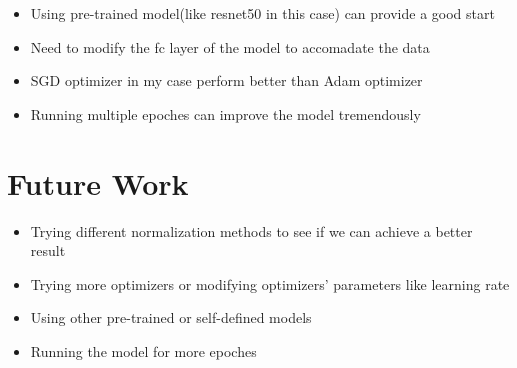 \documentclass[11pt]{article}
\providecommand{\tightlist}{%
      \setlength{\itemsep}{0pt}\setlength{\parskip}{0pt}}
\begin{document}
    \begin{itemize}
\tightlist
\item
  Using pre-trained model(like resnet50 in this case) can provide a good
  start
\item
  Need to modify the fc layer of the model to accomadate the data
\item
  SGD optimizer in my case perform better than Adam optimizer
\item
  Running multiple epoches can improve the model tremendously
\end{itemize}

    \hypertarget{future-work}{%
\section{Future Work}\label{future-work}}

    \begin{itemize}
\tightlist
\item
  Trying different normalization methods to see if we can achieve a
  better result
\item
  Trying more optimizers or modifying optimizers' parameters like
  learning rate
\item
  Using other pre-trained or self-defined models
\item
  Running the model for more epoches
\end{itemize}

    


    
    
    
\end{document}
